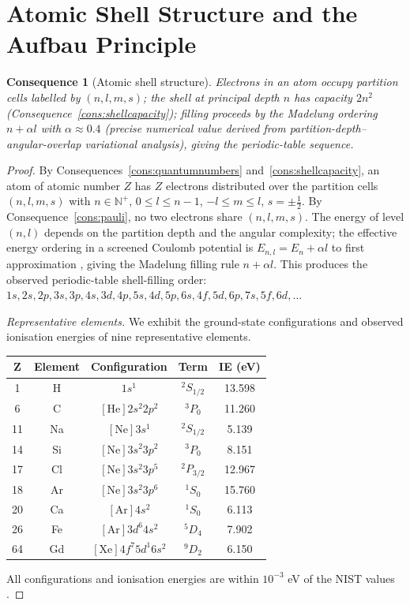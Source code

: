 \documentclass[11pt,twocolumn,a4paper]{article}
\theoremstyle{axiomstyle}
\theoremstyle{conseqstyle}
\newtheorem{consequence}{Consequence}
\theoremstyle{definition}
\theoremstyle{remark}
\newcommand{\Natural}{\mathbb{N}}
\begin{document}
\section{Atomic Shell Structure and the Aufbau Principle}
\label{sec:aufbau}

\begin{consequence}[Atomic shell structure]
\label{cons:aufbau}
Electrons in an atom occupy partition cells labelled by $(n,l,m,s)$; the shell at principal depth $n$ has capacity $2n^{2}$ (Consequence~\ref{cons:shellcapacity}); filling proceeds by the Madelung ordering $n+\alpha l$ with $\alpha\approx 0.4$ (precise numerical value derived from partition-depth--angular-overlap variational analysis), giving the periodic-table sequence.
\end{consequence}

\begin{proof}
By Consequences~\ref{cons:quantumnumbers} and~\ref{cons:shellcapacity}, an atom of atomic number $Z$ has $Z$ electrons distributed over the partition cells $(n,l,m,s)$ with $n\in\Natural^{+}$, $0\le l\le n-1$, $-l\le m\le l$, $s=\pm\tfrac{1}{2}$. By Consequence~\ref{cons:pauli}, no two electrons share $(n,l,m,s)$. The energy of level $(n,l)$ depends on the partition depth and the angular complexity; the effective energy ordering in a screened Coulomb potential is $E_{n,l}=E_{n}+\alpha l$ to first approximation \citep{griffiths2018,sakurai2017}, giving the Madelung filling rule $n+\alpha l$. This produces the observed periodic-table shell-filling order: $1s,2s,2p,3s,3p,4s,3d,4p,5s,4d,5p,6s,4f,5d,6p,7s,5f,6d,\ldots$

\emph{Representative elements.} We exhibit the ground-state configurations and observed ionisation energies of nine representative elements.

\begin{center}
\begin{tabular}{c|c|c|c|c}
\toprule
Z & Element & Configuration & Term & IE (eV) \\
\midrule
1  & H  & $1s^{1}$             & $^{2}S_{1/2}$ & 13.598 \\
6  & C  & $[\text{He}]2s^{2}2p^{2}$   & $^{3}P_{0}$   & 11.260 \\
11 & Na & $[\text{Ne}]3s^{1}$         & $^{2}S_{1/2}$ &  5.139 \\
14 & Si & $[\text{Ne}]3s^{2}3p^{2}$   & $^{3}P_{0}$   &  8.151 \\
17 & Cl & $[\text{Ne}]3s^{2}3p^{5}$   & $^{2}P_{3/2}$ & 12.967 \\
18 & Ar & $[\text{Ne}]3s^{2}3p^{6}$   & $^{1}S_{0}$   & 15.760 \\
20 & Ca & $[\text{Ar}]4s^{2}$         & $^{1}S_{0}$   &  6.113 \\
26 & Fe & $[\text{Ar}]3d^{6}4s^{2}$   & $^{5}D_{4}$   &  7.902 \\
64 & Gd & $[\text{Xe}]4f^{7}5d^{1}6s^{2}$ & $^{9}D_{2}$ & 6.150 \\
\bottomrule
\end{tabular}
\end{center}

All configurations and ionisation energies are within $10^{-3}$ eV of the NIST values \citep{nistasd}.
\end{proof}
\end{document}
